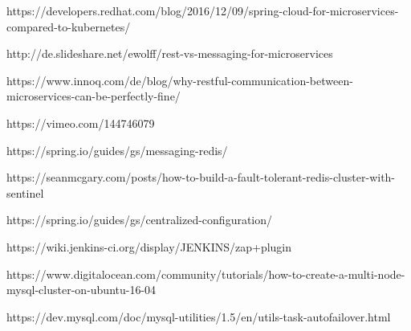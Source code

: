 https://developers.redhat.com/blog/2016/12/09/spring-cloud-for-microservices-compared-to-kubernetes/

http://de.slideshare.net/ewolff/rest-vs-messaging-for-microservices

https://www.innoq.com/de/blog/why-restful-communication-between-microservices-can-be-perfectly-fine/

https://vimeo.com/144746079

https://spring.io/guides/gs/messaging-redis/

https://seanmcgary.com/posts/how-to-build-a-fault-tolerant-redis-cluster-with-sentinel

https://spring.io/guides/gs/centralized-configuration/

https://wiki.jenkins-ci.org/display/JENKINS/zap+plugin

https://www.digitalocean.com/community/tutorials/how-to-create-a-multi-node-mysql-cluster-on-ubuntu-16-04

https://dev.mysql.com/doc/mysql-utilities/1.5/en/utils-task-autofailover.html